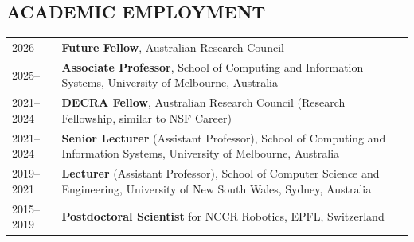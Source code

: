 
\subsection{ACADEMIC EMPLOYMENT}
\vspace{2pt}

\noindent
\begin{tabularx}{\textwidth}{@{}lX@{}}
2026--      & \textbf{Future Fellow}, Australian Research Council \\[3pt]
2025--      & \textbf{Associate Professor}, School of Computing and Information Systems, University of Melbourne, Australia \\[3pt]
2021--2024  & \textbf{DECRA Fellow}, Australian Research Council (Research Fellowship, similar to NSF Career) \\[3pt]
2021--2024  & \textbf{Senior Lecturer} (Assistant Professor), School of Computing and Information Systems, University of Melbourne, Australia \\
2019--2021  & \textbf{Lecturer} (Assistant Professor), School of Computer Science and Engineering, University of New South Wales, Sydney, Australia \\
2015--2019  & \textbf{Postdoctoral Scientist} for NCCR Robotics, EPFL, Switzerland \\
\end{tabularx}
